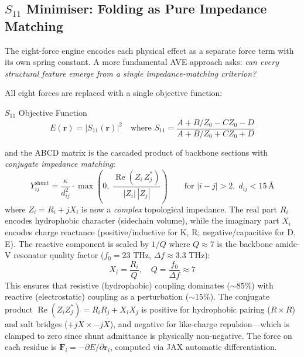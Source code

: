 \subsection{$S_{11}$ Minimiser: Folding as Pure Impedance Matching}
\label{sec:s11_minimiser}

The eight-force engine encodes each physical effect as a separate force term with its own spring constant. A more fundamental AVE approach asks: \emph{can every structural feature emerge from a single impedance-matching criterion?}

All eight forces are replaced with a single objective function:
\begin{resultbox}{$S_{11}$ Objective Function}
\begin{equation}
    E(\mathbf{r}) = |S_{11}(\mathbf{r})|^2 \quad \text{where } S_{11} = \frac{A + B/Z_0 - CZ_0 - D}{A + B/Z_0 + CZ_0 + D}
    \label{eq:s11_energy}
\end{equation}
\end{resultbox}
and the ABCD matrix is the cascaded product of backbone sections with \emph{conjugate impedance matching}:
\begin{equation}
    Y_{ij}^{\text{shunt}} = \frac{\kappa}{d_{ij}^2} \cdot \max\!\left(0,\; \frac{\operatorname{Re}(Z_i \, Z_j^*)}{|Z_i|\,|Z_j|}\right) \qquad \text{for } |i - j| > 2, \; d_{ij} < 15\,\text{\AA}
    \label{eq:shunt_coupling}
\end{equation}
where $Z_i = R_i + jX_i$ is now a \emph{complex} topological impedance. The real part $R_i$ encodes hydrophobic character (sidechain volume), while the imaginary part $X_i$ encodes charge reactance (positive/inductive for K, R; negative/capacitive for D, E). The reactive component is scaled by $1/Q$ where $Q \approx 7$ is the backbone amide-V resonator quality factor ($f_0 = 23$ THz, $\Delta f \approx 3.3$ THz):
\begin{equation}
    X_i = \frac{R_i}{Q}, \quad Q = \frac{f_0}{\Delta f} \approx 7
    \label{eq:q_factor}
\end{equation}
This ensures that resistive (hydrophobic) coupling dominates ($\sim 85\%$) with reactive (electrostatic) coupling as a perturbation ($\sim 15\%$). The conjugate product $\operatorname{Re}(Z_i Z_j^*) = R_i R_j + X_i X_j$ is positive for hydrophobic pairing ($R \times R$) and salt bridges ($+jX \times -jX$), and negative for like-charge repulsion---which is clamped to zero since shunt admittance is physically non-negative. The force on each residue is $\mathbf{F}_i = -\partial E / \partial \mathbf{r}_i$, computed via JAX automatic differentiation.


